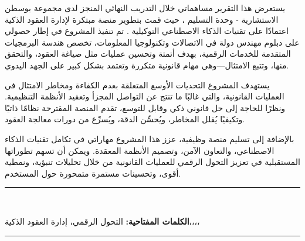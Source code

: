 \begin{RLtext}

يستعرض هذا التقرير مساهماتي خلال التدريب النهائي المنجز لدى مجموعة بوسطن الاستشارية - وحدة التسليم ، حيث قمت بتطوير منصة مبتكرة لإدارة العقود الذكية اعتمادًا على تقنيات الذكاء الاصطناعي التوكيلية . تم تنفيذ المشروع في إطار حصولي على دبلوم مهندس دولة في الاتصالات وتكنولوجيا المعلومات، تخصص هندسة البرمجيات المتقدمة للخدمات الرقمية، بهدف أتمتة وتحسين عمليات مثل صياغة العقود، والتحقق منها، وتتبع الامتثال—وهي مهام قانونية متكررة وتعتمد بشكل كبير على الجهد اليدوي.

يستهدف المشروع التحديات الأوسع المتعلقة بعدم الكفاءة ومخاطر الامتثال في العمليات القانونية، والتي غالبًا ما تنتج عن التواصل المجزأ وتعقيد الأنظمة التنظيمية. ونظرًا للحاجة إلى حل قانوني ذكي وقابل للتوسع، تقدم المنصة المقترحة نظامًا ذاتيًا وتكيفيًا يُقلل المخاطر، ويُحسِّن الدقة، ويُسرِّع من دورات معالجة العقود.

بالإضافة إلى تسليم منصة وظيفية، عزز هذا المشروع مهاراتي في تكامل تقنيات الذكاء الاصطناعي، والتعاون الآمن، وتصميم الأنظمة المعقدة. ويمكن أن تسهم تطوراتها المستقبلية في تعزيز التحول الرقمي للعمليات القانونية من خلال تحليلات تنبؤية، ونمطية أقوى، وتحسينات مستمرة متمحورة حول المستخدم.

\bigskip
\end{RLtext}

\noindent\rule{\linewidth}{0.3mm} \\[0.05cm] 
\begin{RLtext}
    \textbf{الكلمات المفتاحية:} التحول الرقمي، إدارة العقود الذكية،،،،
\end{RLtext}

\noindent\rule{\linewidth}{0.3mm} \\[0.6cm]